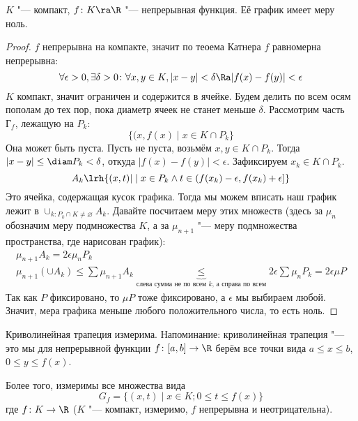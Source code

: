 \begin{theorem}
	$K$ "--- компакт, $f\colon K \ra \R$ "--- непрерывная функция.
	Её график имеет меру ноль.
\end{theorem}
\begin{proof}
	$f$ непрерывна на компакте, значит по теоема Катнера $f$ равномерна непрерывна:
	\[ \forall \epsilon > 0, \exists \delta > 0\colon \forall x, y \in K, |x - y| < \delta \Ra |f(x) - f(y)| < \epsilon \]
	$K$ компакт, значит ограничен и содержится в ячейке.
	Будем делить по всем осям пополам до тех пор, пока диаметр ячеек не станет меньше $\delta$.
	Рассмотрим часть $Г_f$, лежащую на $P_k$:
	\[ \{(x, f(x) \mid x \in K \cap P_k \} \]
	Она может быть пуста.
	Пусть не пуста, возьмём $x, y \in K \cap P_k$.
	Тогда $|x - y| \le \diam P_k < \delta$, откуда $|f(x) - f(y)| < \epsilon$.
	Зафиксируем $x_k \in K \cap P_k$.
	\[ A_k \lrh \{(x, t) | \mid x \in P_k \land t \in (f(x_k) - \epsilon, f(x_k) + \epsilon] \} \]
	Это ячейка, содержащая кусок графика.
	Тогда мы можем вписать наш график лежит в $\cup_{k \colon P_k \cap K \neq \varnothing} A_k$.
	Давайте посчитаем меру этих множеств (здесь за $\mu_n$ обозначим меру подмножества $K$, а за $\mu_{n+1}$ "--- меру подмножества пространства, где нарисован график):
	\begin{gather*}
	  \mu_{n+1} A_k = 2\epsilon \mu_n P_k \\
	  \mu_{n+1} (\cup A_k) \le \sum \mu_{n+1} A_k \underbrace{\le}_{\text{слева сумма не по всем $k$, а справа по всем}} 2\epsilon \sum \mu_n P_k = 2\epsilon \mu P
	\end{gather*}
	Так как $P$ фиксировано, то $\mu P$ тоже фиксировано, а $\epsilon$ мы выбираем любой.
	Значит, мера графика меньше любого положительного числа, то есть ноль.
\end{proof}
\begin{conseq}
	Криволинейная трапеция  измерима.
	Напоминание: криволинейная трапеция "--- это мы для непрерывной
	функции $f\colon [a, b] \to \R$ берём все точки вида $a \le x \le b$, $0 \le y \le f(x)$.

	Более того, измеримы все множества вида
	\[ G_f = \{(x, t) \mid x \in K; 0 \le t \le f(x)\} \]
	где	$f \colon K \to \R$ ($K$ "--- компакт, измеримо, $f$ непрерывна и неотрицательна).
\end{conseq}
